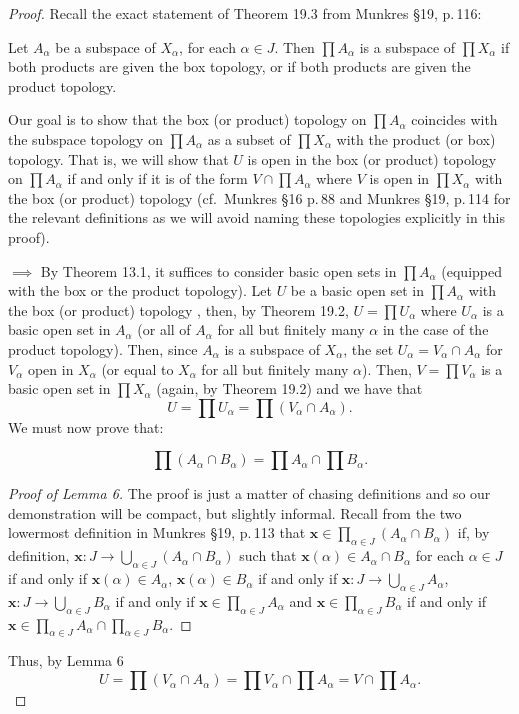 \begin{proof}
Recall the exact statement of Theorem 19.3 from Munkres \S19,
p.\,116:
\begin{theorem*}
Let $A_\alpha$ be a subspace of $X_\alpha$, for each $\alpha\in
J$. Then $\prod A_\alpha$ is a subspace of $\prod X_\alpha$ if
both products are given the box topology, or if both products are
given the product topology.
\end{theorem*}
Our goal is to show that the box (or product) topology on $\prod
A_\alpha$ coincides with the subspace topology on $\prod
A_\alpha$ as a subset of $\prod X_\alpha$ with the product (or
box) topology. That is, we will show that $U$ is open in the
box (or product) topology on $\prod A_\alpha$ if and only if it
is of the form $V\cap\prod A_\alpha$ where $V$ is open in $\prod
X_\alpha$ with the box (or product) topology (cf.\, Munkres \S16
p.\,88 and Munkres \S19, p.\,114 for the relevant
definitions as we will avoid naming these topologies explicitly
in this proof).

$\implies$ By Theorem 13.1, it suffices to consider basic open
sets in $\prod A_\alpha$ (equipped with the box or the product
topology). Let $U$ be a basic open set in $\prod A_\alpha$ with
the box (or product) topology , then, by Theorem 19.2, $U=\prod
U_\alpha$ where $U_\alpha$ is a basic open set in $A_\alpha$ (or
all of $A_\alpha$ for all but finitely many $\alpha$ in the case
of the product topology). Then, since $A_\alpha$ is a subspace of
$X_\alpha$, the set $U_\alpha=V_\alpha\cap A_\alpha$ for
$V_\alpha$ open in $X_\alpha$ (or equal to $X_\alpha$ for all but
finitely many $\alpha$). Then, $V=\prod V_\alpha$ is a basic open
set in $\prod X_\alpha$ (again, by Theorem 19.2) and we have that
\[
U=\prod U_\alpha=\prod\left(V_\alpha\cap A_\alpha\right).
\]
We must now prove that:
\begin{lemma}
\[
\prod (A_\alpha\cap B_\alpha)=\prod A_\alpha\cap\prod B_\alpha.
\]
\end{lemma}
\begin{proof}[Proof of Lemma 6]
\renewcommand\qedsymbol{$\clubsuit$}
The proof is just a matter of chasing definitions and so our
demonstration will be compact, but slightly informal. Recall
from the two lowermost definition in Munkres \S19, p.\,113  that
$\mathbf{x}\in\prod_{\alpha\in J} \left(A_\alpha\cap
  B_\alpha\right)$ if, by definition, $\mathbf{x}\colon
J\to\bigcup_{\alpha\in   J}\left(A_\alpha\cap B_\alpha\right)$
such that $\mathbf{x}(\alpha)\in A_\alpha\cap B_\alpha$ for each
$\alpha\in J$ if and only if $\mathbf{x}(\alpha)\in A_\alpha$,
$\mathbf{x}(\alpha)\in B_\alpha$ if and only if $\mathbf{x}\colon
J\to\bigcup_{\alpha\in J}A_\alpha$, $\mathbf{x}\colon
J\to\bigcup_{\alpha\in J}B_\alpha$ if and only if
$\mathbf{x}\in\prod_{\alpha\in J}A_\alpha$ and
$\mathbf{x}\in\prod_{\alpha\in J}B_\alpha$ if and only if
$\mathbf{x}\in\prod_{\alpha\in J}A_\alpha\cap\prod_{\alpha\in
  J}B_\alpha$.
\end{proof}
Thus, by Lemma 6
\[
U
=\prod\left(V_\alpha\cap A_\alpha\right)
=\prod V_\alpha\cap\prod A_\alpha
=V\cap\prod A_\alpha.
\]


\end{proof}
